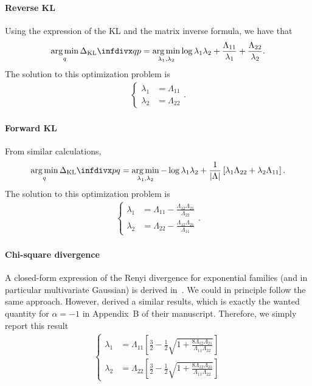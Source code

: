 \paragraph{Reverse KL}
Using the expression of the KL and the matrix inverse formula, we have that
\begin{align}
    \argmin_q \kl{q}{p} = \argmin_{\lambda_1, \lambda_2} \log \lambda_1\lambda_2 + \frac{\Lambda_{11}}{\lambda_1} + \frac{\Lambda_{22}}{\lambda_2}.
\end{align}
The solution to this optimization problem is 
\begin{align}
\left\{
\begin{array}{ll}
\lambda_1 &= \Lambda_{11} \\
\lambda_2 &= \Lambda_{22} 
\end{array} \right..
\end{align}

\paragraph{Forward KL}
From similar calculations,
\begin{align}
    \argmin_q \kl{p}{q} = \argmin_{\lambda_1, \lambda_2} -\log \lambda_1\lambda_2 + \frac{1}{|\Lambda|}\left[\lambda_1\Lambda_{22} + \lambda_2\Lambda_{11}\right].
\end{align}
The solution to this optimization problem is 
\begin{align}
\left\{
\begin{array}{ll}
\lambda_1 &= \Lambda_{11} - \frac{\Lambda_{12}\Lambda_{21}}{\Lambda_{22}} \\
\lambda_2 &= \Lambda_{22} - \frac{\Lambda_{12}\Lambda_{21}}{\Lambda_{11}} 
\end{array} \right..
\end{align}


\paragraph{Chi-square divergence}
A closed-form expression of the Renyi divergence for exponential families (and in particular multivariate Gaussian) is derived in~\cite{burbea1984convexity}. We could in principle follow the same approach. However, \cite{NIPS2016_6528} derived a similar results, which is exactly the wanted quantity for $\alpha = -1$ in Appendix~B of their manuscript. Therefore, we simply report this result 
\begin{align}
\left\{
\begin{array}{ll}
\lambda_1 &= \Lambda_{11}\left[ \frac{3}{2} - \frac{1}{2}\sqrt{1 + \frac{8\Lambda_{12}\Lambda_{21}}{\Lambda_{11}\Lambda_{22}}}\right] \\
\lambda_2 &= \Lambda_{22}\left[ \frac{3}{2} - \frac{1}{2}\sqrt{1 + \frac{8\Lambda_{12}\Lambda_{21}}{\Lambda_{11}\Lambda_{22}}}\right]  
\end{array} \right.
\end{align}


